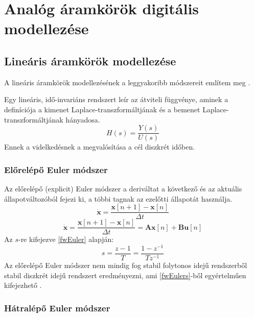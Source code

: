 \chapter{Analóg áramkörök digitális modellezése}

\section{Lineáris áramkörök modellezése}

A lineáris áramkörök modellezésének a leggyakoribb módszereit említem meg \cite{transformations} \cite{eulers}.

Egy lineáris, idő-invariáns rendszert leír az átviteli függvénye, aminek a definíciója  a kimenet 
Laplace-transzformáltjának és a bemenet Laplace-transzformáltjának hányadosa.
\begin{equation}
    H(s)=\frac{Y(s)}{U(s)}
\end{equation}
Ennek a videlkedésnek a megvalósítása a cél diszkrét időben.

\subsection{Előrelépő Euler módszer}

Az előrelépő (explicit) Euler módszer a deriváltat a következő és az aktuális állapotváltozóból fejezi ki, a többi tagnak
az ezelőtti állapotát használja.
\begin{equation}
    \mathbf{\dot{x}}=\frac{\mathbf{x}[n+1]-\mathbf{x}[n]}{\Delta{}t}
\label{fwEuler}
\end{equation}
\begin{equation}
    \mathbf{\dot{x}}=\frac{\mathbf{x}[n+1]-\mathbf{x}[n]}{\Delta{}t}=\mathbf{A}\mathbf{x}[n]+\mathbf{Bu}[n]
\end{equation}
Az $s$-re kifejezve \ref{fwEuler} alapján:
\begin{equation}
    s=\frac{z-1}{T}=\frac{1-z^{-1}}{Tz^{-1}}
\label{fwEulers}
\end{equation}
Az előrelépő Euler módszer nem mindig fog stabil folytonos idejű rendszerből stabil diszkrét idejű rendszert 
eredményezni, ami \ref{fwEulers}-ből egyértelműen kifejezhető \cite{transformations}.

\subsection{Hátralépő Euler módszer}

